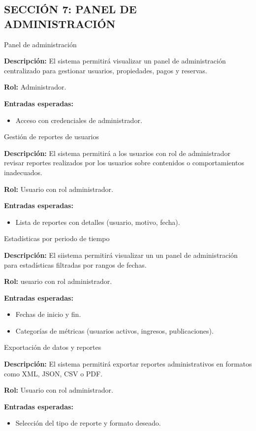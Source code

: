 \subsection*{\uppercase{Sección 7: Panel de Administración}}
\begin{requisito}{Panel de administración}
	\item \textbf{Descripción:} El sistema permitirá visualizar un panel de administración centralizado para gestionar usuarios, propiedades, pagos y reservas.
	\item \textbf{Rol:} Administrador.
	\item \textbf{Entradas esperadas:}
	\begin{itemize}
		\item Acceso con credenciales de administrador.
	\end{itemize}
\end{requisito}
\begin{requisito}{Gestión de reportes de usuarios}
	\item \textbf{Descripción:} El sistema permitirá a los usuarios con rol de administrador revisar reportes realizados por los usuarios sobre contenidos o comportamientos inadecuados.
	\item \textbf{Rol:} Usuario con rol administrador.
	\item \textbf{Entradas esperadas:}
	\begin{itemize}
		\item Lista de reportes con detalles (usuario, motivo, fecha).
	\end{itemize}
\end{requisito}
\begin{requisito}{Estadísticas por periodo de tiempo}
	\item \textbf{Descripción:} El siistema permitirá visualizar un un panel de administración para estadísticas filtradas por rangos de fechas.
	\item \textbf{Rol:} usuario con rol administrador.
	\item \textbf{Entradas esperadas:}
	\begin{itemize}
		\item Fechas de inicio y fin.
		\item Categorías de métricas (usuarios activos, ingresos, publicaciones).
	\end{itemize}
\end{requisito}
\begin{requisito}{Exportación de datos y reportes}
	\item \textbf{Descripción:} El sistema permitirá exportar reportes administrativos en formatos como XML, JSON, CSV o PDF.
	\item \textbf{Rol:} Usuario con rol administrador.
	\item \textbf{Entradas esperadas:}
	\begin{itemize}
		\item Selección del tipo de reporte y formato deseado.
	\end{itemize}
\end{requisito}